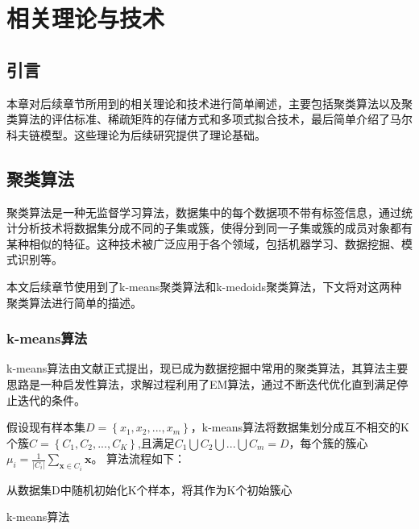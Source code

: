 \chapter{相关理论与技术}

\section{引言}

本章对后续章节所用到的相关理论和技术进行简单阐述，主要包括聚类算法以及聚类算法的评估标准、稀疏矩阵的存储方式和多项式拟合技术，最后简单介绍了马尔科夫链模型。这些理论为后续研究提供了理论基础。

\section{聚类算法}
聚类算法是一种无监督学习算法，数据集中的每个数据项不带有标签信息，通过统计分析技术将数据集分成不同的子集或簇，使得分到同一子集或簇的成员对象都有某种相似的特征。这种技术被广泛应用于各个领域，包括机器学习、数据挖掘、模式识别等。

本文后续章节使用到了k-means聚类算法和k-medoids聚类算法，下文将对这两种聚类算法进行简单的描述。

\subsection{k-means算法}

k-means算法由文献\cite{hartigan1979algorithm}正式提出，现已成为数据挖掘中常用的聚类算法，其算法主要思路是一种启发性算法，求解过程利用了EM算法，通过不断迭代优化直到满足停止迭代的条件。

假设现有样本集$D=\left\{x_1,x_2,...,x_m\right\}$，k-means算法将数据集划分成互不相交的K个簇$C=\left\{C_1,C_2,...,C_K\right\}$,且满足$C_1\bigcup{C_2\bigcup{...\bigcup{C_m=D}}}$，每个簇的簇心$\mu _i=\frac{1}{|C_i|}\sum_{\mathbf{x}\in C_i}{\mathbf{x}}$。
算法流程如下：\\
\begin{algorithm}[H]
	 从数据集D中随机初始化K个样本，将其作为K个初始簇心\;
	 \caption{k-means算法}
	\label{kmeans}
\end{algorithm}

